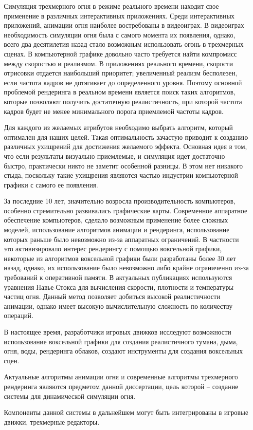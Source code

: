Симуляция трехмерного огня в режиме реального времени находит свое применение в
различных интерактивных приложениях.  Среди интерактивных приложений, анимации
огня наиболее востребованы в видеоиграх. В видеоиграх необходимость симуляции
огня была с самого момента их появления, однако, всего два десятилетия назад
стало возможным использовать огонь в трехмерных сценах.  В компьютерной графике
довольно часто требуется найти компромисс между скоростью и реализмом. В
приложениях реального времени, скорости отрисовки отдается наибольший приоритет;
увеличенный реализм бесполезен, если частота кадров не дотягивает до
определенного уровня. Поэтому основной проблемой рендеринга в реальном времени
является поиск таких алгоритмов, которые позволяют получить достаточную
реалистичность, при которой частота кадров будет не менее минимального порога
приемлемой частоты кадров.

Для каждого из желаемых атрибутов необходимо выбрать алгоритм, который оптимален
для наших целей. Такая оптимальность зачастую приводит к созданию различных
ухищрений для достижения желаемого эффекта. Основная идея в том, что если
результаты визуально приемлемые, и симуляция идет достаточно быстро, практически
никто не заметит особенной разницы. В этом нет никакого стыда, поскольку такие
ухищрения являются частью индустрии компьютерной графики с самого ее появления.

За последние 10 лет, значительно возросла производительность компьютеров,
особенно стремительно развивались графические карты. Современное аппаратное
обеспечение компьютеров, сделало возможным применение более сложных моделей,
использование алгоритмов анимации и рендеринга, использование которых раньше
было невозможно из-за аппаратных ограничений. В частности это активизировало
интерес рендерингу с помощью воксельной графики, некоторые из алгоритмов
воксельной графики были разработаны более 30 лет назад, однако, их использование
было невозможно либо крайне ограниченно из-за требований к оперативной памяти. В
актуальных публикациях используются уравнения Навье-Стокса для вычисления
скорости, плотности и температуры частиц огня.  Данный метод позволяет добиться
высокой реалистичности анимации, однако имеет высокую вычислительную сложность
по количеству операций.

В настоящее время, разработчики игровых движков исследуют возможности
использование воксельной графики для создания реалистичного тумана, дыма, огня,
воды, рендеринга облаков, создают инструменты для создания воксельных сцен.

Актуальные алгоритмы анимации огня и современные алгоритмы трехмерного
рендеринга являются предметом данной диссертации, цель которой -- создание
системы для динамической симуляции огня.

Компоненты данной системы в дальнейшем могут быть интегрированы в игровые
движки, трехмерные редакторы.
